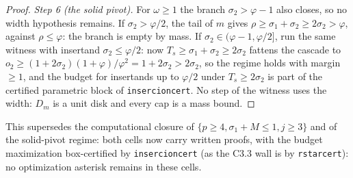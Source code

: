 \documentclass[11pt]{article}
\theoremstyle{definition}
\begin{document}
\begin{proof}
\emph{Step 6 (the solid pivot).} For $\omega\ge1$ the branch
$\sigma_2>\varphi-1$ also closes, so no width hypothesis remains.
If $\sigma_2>\varphi/2$, the tail of $m$ gives
$\rho\ge\sigma_1+\sigma_2\ge2\sigma_2>\varphi$, against
$\rho\le\varphi$: the branch is empty by mass. If
$\sigma_2\in(\varphi-1,\varphi/2]$, run the same witness with
insertand $\sigma_2\le\varphi/2$: now $T_s\ge\sigma_1+\sigma_2\ge
2\sigma_2$ fattens the cascade to
$o_2\ge(1+2\sigma_2)(1+\varphi)/\varphi^2=1+2\sigma_2>2\sigma_2$,
so the regime holds with margin $\ge1$, and the budget for
insertands up to $\varphi/2$ under $T_s\ge2\sigma_2$ is part of the
certified parametric block of \texttt{insercioncert}. No step of
the witness uses the width: $D_m$ is a unit disk and every cap is a
mass bound.
\end{proof}

This supersedes the computational closure of
$\{p\ge4,\sigma_1+M\le1,j\ge3\}$ and of the solid-pivot regime: both
cells now carry written proofs, with the budget maximization
box-certified by \texttt{insercioncert} (as the C3.3
wall is by \texttt{rstarcert}): no optimization asterisk remains in
these cells.
\end{document}

